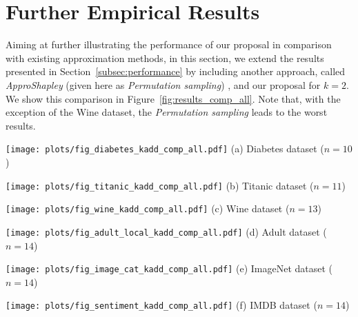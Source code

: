 \section{Further Empirical Results}
\label{app:further_results}

Aiming at further illustrating the performance of our proposal in comparison with existing approximation methods, in this section, we extend the results presented in Section~\ref{subsec:performance} by including another approach, called \emph{ApproShapley} (given here as \emph{Permutation sampling}) \cite{Castro.2009}, and our proposal for $k=2$.
We show this comparison in Figure~\ref{fig:results_comp_all}.
Note that, with the exception of the Wine dataset, the \emph{Permutation sampling} leads to the worst results. 

\begin{figure*}[ht]
\centering
\begin{minipage}[c]{0.32\textwidth}
    \centering
    \texttt{[image: plots/fig\_diabetes\_kadd\_comp\_all.pdf]}
    (a) Diabetes dataset ($n=10$)
    \label{fig:diabetes_kadd_comp_all}
\end{minipage}
\begin{minipage}[c]{0.32\textwidth}
    \centering
    \texttt{[image: plots/fig\_titanic\_kadd\_comp\_all.pdf]}
    (b) Titanic dataset ($n=11$)
    \label{fig:titanic_kadd_comp_all}
\end{minipage}
\begin{minipage}[c]{0.32\textwidth}
    \centering
    \texttt{[image: plots/fig\_wine\_kadd\_comp\_all.pdf]}
    (c) Wine dataset ($n=13$)
    \label{fig:wine_kadd_comp_all}
\end{minipage}
%
\begin{minipage}[c]{0.32\textwidth}
    \centering
    \texttt{[image: plots/fig\_adult\_local\_kadd\_comp\_all.pdf]}
    (d) Adult dataset ($n=14$)
    \label{fig:adult_local_kadd_comp_all}
\end{minipage}
\begin{minipage}[c]{0.32\textwidth}
    \centering
    \texttt{[image: plots/fig\_image\_cat\_kadd\_comp\_all.pdf]}
    (e) ImageNet dataset ($n=14$)
    \label{fig:image_cat_kadd_comp_all}
\end{minipage}
\begin{minipage}[c]{0.32\textwidth}
    \centering
    \texttt{[image: plots/fig\_sentiment\_kadd\_comp\_all.pdf]}
    (f) IMDB dataset ($n=14$)
    \label{fig:sentiment_kadd_comp_all}

\end{minipage}
\end{figure*}
